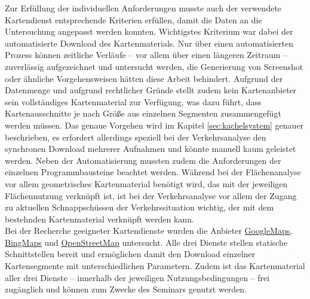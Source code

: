 Zur Erfüllung der individuellen Anforderungen musste auch der verwendete Kartendienst entsprechende Kriterien erfüllen, damit die Daten an die Untersuchung angepasst werden konnten.  Wichtigstes Kriterium war dabei der automatisierte Download des Kartenmaterials. Nur über einen automatisierten Prozess können zeitliche Verläufe -- vor allem über einen längeren Zeitraum -- zuverlässig aufgezeichnet und untersucht werden, die Generierung von Screenshot oder ähnliche Vorgehensweisen hätten diese Arbeit behindert. Aufgrund der Datenmenge und aufgrund rechtlicher Gründe stellt zudem kein Kartenanbieter sein vollständiges Kartenmaterial zur Verfügung, was dazu führt, dass Kartenausschnitte je nach Größe aus einzelnen Segmenten zusammengefügt werden müssen. Das genaue Vorgehen wird im Kapitel \ref{sec:kachelsystem} genauer beschrieben, es erfordert allerdings speziell bei der Verkehrsanalyse den synchronen Download mehrerer Aufnahmen und könnte manuell kaum geleistet werden. Neben der Automatisierung mussten zudem die Anforderungen der einzelnen Programmbausteine beachtet werden. Während bei der Flächenanalyse vor allem geometrisches Kartenmaterial benötigt wird, das mit der jeweiligen Flächennutzung verknüpft ist, ist bei der Verkehrsanalyse vor allem der Zugang zu aktuellen Schnappschüssen der Verkehrssituation wichtig, der mit dem bestehnden Kartenmaterial verknüpft werden kann.\\

Bei der Recherche geeigneter Kartendienste wurden die Anbieter \href{https://www.google.de/maps/}{GoogleMaps}, \href{https://www.bing.com/maps/}{BingMaps} und \href{http://www.openstreetmap.org/}{OpenStreetMap} untersucht. Alle drei Dienste stellen statische Schnittstellen bereit und ermöglichen damit den Download einzelner Kartensegmente mit unterschiedlichen Parametern. Zudem ist das Kartenmaterial aller drei Dienste -- innerhalb der jeweiligen Nutzungsbedingungen -- frei zugänglich und können zum Zwecke des Seminars genutzt werden.\\

